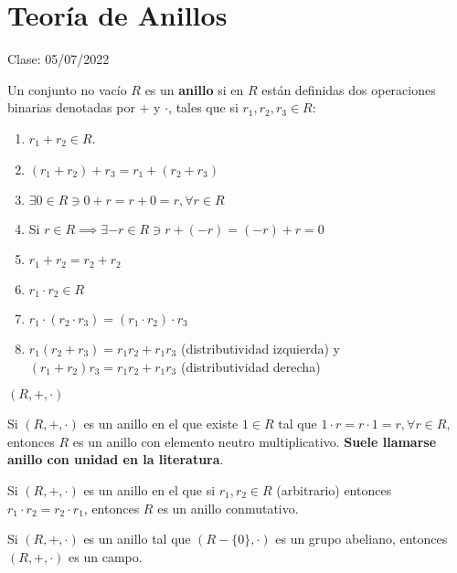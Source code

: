 
\section{Teoría de Anillos}

Clase: 05/07/2022

\begin{definicion}
    Un conjunto no vacío $R$ es un \textbf{anillo} si en $R$ están definidas dos operaciones binarias denotadas por $+$ y $\cdot$, tales que si $r_1,r_2,r_3\in R$: 
    \begin{enumerate}
        \item $r_1+r_2\in R$.
        \item $(r_1+r_2)+r_3 = r_1 +(r_2+r_3)$
        \item $\exists 0\in R\ni 0+r=r+0=r,\forall r\in R$
        \item Si $r\in R\implies \exists -r\in R\ni r+(-r)=(-r)+r =0$
        \item $r_1+r_2 = r_2+r_2$
        \item $r_1\cdot r_2\in R$
        \item $r_1\cdot (r_2\cdot r_3) = (r_1\cdot r_2)\cdot r_3$
        \item $r_1(r_2+r_3)=r_1r_2+r_1r_3$ (distributividad izquierda) y $(r_1+r_2)r_3 =r_1r_2+r_1r_3$ (distributividad derecha)
    \end{enumerate}
\end{definicion}

\begin{nota}
    $(R,+,\cdot)$
\end{nota}

\begin{definicion}
    Si $(R,+,\cdot)$ es un anillo en el que existe $1\in R$ tal que $1\cdot r=r\cdot 1=r,\forall r\in R$, entonces $R$ es un anillo con elemento neutro multiplicativo. \textbf{Suele llamarse anillo con unidad en la literatura}.
\end{definicion}

\begin{definicion}
    Si $(R,+,\cdot)$ es un anillo en el que si $r_1,r_2\in R$ (arbitrario) entonces $r_1\cdot r_2 = r_2\cdot r_1$, entonces $R$ es un anillo conmutativo. 
\end{definicion}

\begin{definicion}
    Si $(R,+,\cdot)$ es un anillo tal que $(R-\{0\},\cdot)$ es un grupo abeliano, entonces $(R,+,\cdot)$ es un campo. 
\end{definicion}

